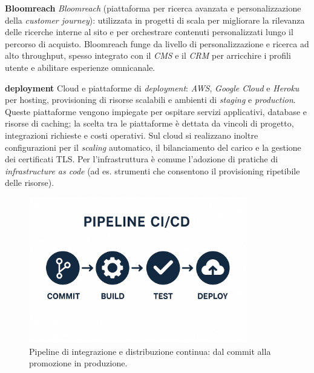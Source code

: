 \medskip
\noindent\textbf{Bloomreach}
\emph{Bloomreach} (piattaforma per ricerca avanzata e personalizzazione della \emph{customer journey}): utilizzata in progetti di scala per migliorare la rilevanza delle ricerche 
interne al sito e per orchestrare contenuti personalizzati lungo il percorso di acquisto. Bloomreach funge da livello di personalizzazione e ricerca ad alto throughput, spesso integrato 
con il \emph{CMS} e il \emph{CRM} per arricchire i profili utente e abilitare esperienze omnicanale.

\medskip
\noindent\textbf{deployment}
Cloud e piattaforme di \emph{deployment}: \emph{AWS}, \emph{Google Cloud} e \emph{Heroku} per hosting, provisioning di risorse scalabili e ambienti di \emph{staging} e \emph{production}. 
Queste piattaforme vengono impiegate per ospitare servizi applicativi, database e risorse di caching; la scelta tra le piattaforme è dettata da vincoli di progetto, integrazioni richieste e costi operativi. 
Sul cloud si realizzano inoltre configurazioni per il \emph{scaling} automatico, il bilanciamento del carico e la gestione dei certificati TLS. Per l’infrastruttura 
è comune l’adozione di pratiche di \emph{infrastructure as code} (ad es. strumenti che consentono il provisioning ripetibile delle risorse).

\begin{figure}[htbp]
    \centering
    \includegraphics[width=0.85\textwidth]{images/azienda/pipeline_cicd}
    \caption{Pipeline di integrazione e distribuzione continua: dal commit alla promozione in produzione.}
    \label{fig:pipeline_cicd}
\end{figure}



